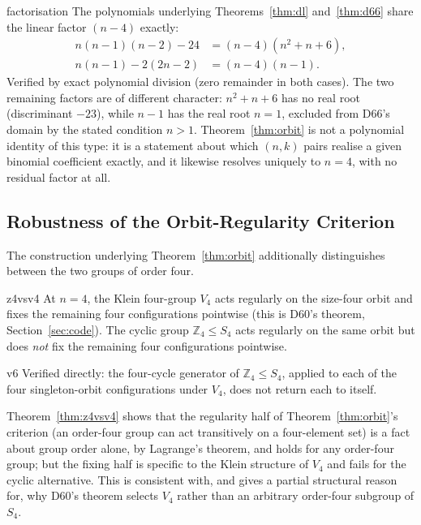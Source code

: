 \documentclass[11pt,a4paper]{article}
\newcommand{\Vfour}{V_4}
\begin{document}
\begin{theorembox}{}{factorisation}
The polynomials underlying Theorems~\ref{thm:dl} and~\ref{thm:d66} share the linear factor $(n-4)$ exactly:
\begin{align}
n(n-1)(n-2)-24 &= (n-4)(n^2+n+6), \label{eq:factor1}\\
n(n-1) - 2(2n-2) &= (n-4)(n-1). \label{eq:factor2}
\end{align}
Verified by exact polynomial division (zero remainder in both cases). The two remaining factors are of different character: $n^2+n+6$ has no real root (discriminant $-23$), while $n-1$ has the real root $n=1$, excluded from D66's domain by the stated condition $n>1$. Theorem~\ref{thm:orbit} is not a polynomial identity of this type: it is a statement about which $(n,k)$ pairs realise a given binomial coefficient exactly, and it likewise resolves uniquely to $n=4$, with no residual factor at all.
\end{theorembox}

\subsection{Robustness of the Orbit-Regularity Criterion}

The construction underlying Theorem~\ref{thm:orbit} additionally distinguishes between the two groups of order four.

\begin{theorembox}{}{z4vsv4}
At $n=4$, the Klein four-group $\Vfour$ acts regularly on the size-four orbit and fixes the remaining four configurations pointwise (this is D60's theorem, Section~\ref{sec:code}). The cyclic group $\mathbb{Z}_4\le S_4$ acts regularly on the same orbit but does \emph{not} fix the remaining four configurations pointwise.
\end{theorembox}

\begin{verifbox}{}{v6}
Verified directly: the four-cycle generator of $\mathbb{Z}_4\le S_4$, applied to each of the four singleton-orbit configurations under $\Vfour$, does not return each to itself.
\end{verifbox}

Theorem~\ref{thm:z4vsv4} shows that the regularity half of Theorem~\ref{thm:orbit}'s criterion (an order-four group can act transitively on a four-element set) is a fact about group order alone, by Lagrange's theorem, and holds for any order-four group; but the fixing half is specific to the Klein structure of $\Vfour$ and fails for the cyclic alternative. This is consistent with, and gives a partial structural reason for, why D60's theorem selects $\Vfour$ rather than an arbitrary order-four subgroup of $S_4$.
\end{document}
